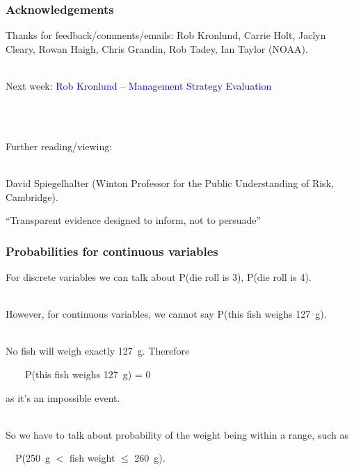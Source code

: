 
\begin{frame}
\frametitle{Acknowledgements}

Thanks for feedback/comments/emails: Rob Kronlund, Carrie Holt, Jaclyn Cleary,
Rowan Haigh, Chris Grandin, Rob Tadey,
Ian Taylor (NOAA).

~\\

Next week: \textcolor{blue}{Rob Kronlund -- Management Strategy Evaluation}

~\\

~\\

\pause

Further reading/viewing:

~\\

David Spiegelhalter (Winton Professor for the Public Understanding of Risk, Cambridge).

\pause

\bc
\alert{``Transparent evidence designed to inform, not to persuade''}
\ec




\end{frame}




\begin{frame}
\frametitle{Probabilities for continuous variables}

For discrete variables we can talk about P(die roll is 3), P(die roll is 4).

~\\

However, for continuous variables, we cannot say P(this fish weighs 127~g).

~\\

No fish will weigh \alert{exactly} 127~g. Therefore

~~~~P(this fish weighs 127~g) = 0

as it's an impossible event.

~\\

So we have to talk about probability of the weight being within a range, such
as

~~P(250~g $<$ fish weight $\leq$ 260~g).






\end{frame}

